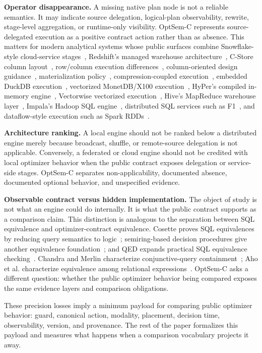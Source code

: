 \textbf{Operator disappearance.} A missing native plan node is not a reliable semantics.  It may indicate source delegation, logical-plan observability, rewrite, stage-level aggregation, or runtime-only visibility.  OptSem-C represents source-delegated execution as a positive contract action rather than as absence.  This matters for modern analytical systems whose public surfaces combine Snowflake-style cloud-service stages~\cite{dageville2016snowflake}, Redshift's managed warehouse architecture~\cite{gupta2015redshift}, C-Store column layout~\cite{stonebraker2005cstore}, row/column execution differences~\cite{abadi2008columnstores}, column-oriented design guidance~\cite{abadi2013columnoriented}, materialization policy~\cite{abadi2007materialization}, compression-coupled execution~\cite{abadi2006compression}, embedded DuckDB execution~\cite{raasveldt2019duckdb}, vectorized MonetDB/X100 execution~\cite{boncz2005monetdb}, HyPer's compiled in-memory engine~\cite{kemper2011hyper}, Vectorwise vectorized execution~\cite{zukowski2012vectorwise}, Hive's MapReduce warehouse layer~\cite{thusoo2009hive}, Impala's Hadoop SQL engine~\cite{kornacker2015impala}, distributed SQL services such as F1~\cite{shute2013f1}, and dataflow-style execution such as Spark RDDs~\cite{zaharia2012resilient}.

\textbf{Architecture ranking.} A local engine should not be ranked below a distributed engine merely because broadcast, shuffle, or remote-source delegation is not applicable.  Conversely, a federated or cloud engine should not be credited with local optimizer behavior when the public contract exposes delegation or service-side stages.  OptSem-C separates non-applicability, documented absence, documented optional behavior, and unspecified evidence.

\textbf{Observable contract versus hidden implementation.} The object of study is not what an engine could do internally.  It is what the public contract supports as a comparison claim.  This distinction is analogous to the separation between SQL equivalence and optimizer-contract equivalence.  Cosette proves SQL equivalences by reducing query semantics to logic~\cite{chu2017cosette}; semiring-based decision procedures give another equivalence foundation~\cite{chu2018usemiring}; and QED expands practical SQL equivalence checking~\cite{wang2024qed}.  Chandra and Merlin characterize conjunctive-query containment~\cite{chandra1977optimal}; Aho et al. characterize equivalence among relational expressions~\cite{aho1979equivalences}.  OptSem-C asks a different question: whether the public optimizer behavior being compared exposes the same evidence layers and comparison obligations.

These precision losses imply a minimum payload for comparing public optimizer behavior: guard, canonical action, modality, placement, decision time, observability, version, and provenance.  The rest of the paper formalizes this payload and measures what happens when a comparison vocabulary projects it away.
